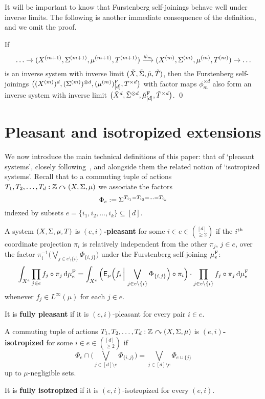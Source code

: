\documentclass[12pt]{article}
\begin{document}
It will be important to know that Furstenberg self-joinings behave
well under inverse limits.  The following is another immediate
consequence of the definition, and we omit the proof.

\begin{lem}\label{lem:Fberg-inv-lim}
If
\[\ldots\to(X^{(m+1)},\S^{(m+1)},\mu^{(m+1)},T^{(m+1)})\stackrel{\psi_m}{\longrightarrow}(X^{(m)},\S^{(m)},\mu^{(m)},T^{(m)})\to\ldots\]
is an inverse system with inverse limit
$(\tilde{X},\tilde{\S},\tilde{\mu},\tilde{T})$, then the Furstenberg
self-joinings $\big((X^{(m)})^d,(\S^{(m)})^{\otimes
d},(\mu^{(m)})^{\rm{F}}_{[d]},T^{\times d}\big)$ with factor maps
$\phi_m^{\times d}$ also form an inverse system with inverse limit
$\big(\tilde{X}^d,\tilde{\S}^{\otimes
d},\tilde{\mu}^{\rm{F}}_{[d]},\tilde{T}^{\times d}\big)$. \qed
\end{lem}

\section{Pleasant and isotropized extensions}

We now introduce the main technical definitions of this paper: that
of `pleasant systems', closely following~\cite{Aus--nonconv}, and
alongside them the related notion of `isotropized systems'. Recall
that to a commuting tuple of actions
$T_1,T_2,\ldots,T_d:\bbZ\curvearrowright (X,\S,\mu)$ we associate
the factors
\[\Phi_e := \S^{T_{i_1} = T_{i_2} = \ldots = T_{i_k}}\]
indexed by subsets $e = \{i_1,i_2,\ldots,i_k\}\subseteq [d]$.

\begin{dfn}\label{dfn:pleasant}
A system $(X,\S,\mu,T)$ is \textbf{$(e,i)$-pleasant} for some $i \in
e\in\binom{[d]}{\geq 2}$ if the $i^{\rm{th}}$ coordinate projection
$\pi_i$ is relatively independent from the other $\pi_j$, $j \in e$,
over the factor $\pi_i^{-1}\big(\bigvee_{j\in e
\setminus\{i\}}\Phi_{\{i,j\}}\big)$ under the Furstenberg
self-joining $\mu^{\rm{F}}_e$:
\[\int_{X^e}\prod_{j\in e}f_j\circ\pi_j\,\d\mu^{\rm{F}}_e =
\int_{X^e}\Big(\sfE_\mu\Big(f_i\,\Big|\,\bigvee_{j\in e
\setminus\{i\}}\Phi_{\{i,j\}}\Big)\circ\pi_i\Big)\cdot\prod_{j\in
e\setminus \{i\}}f_j\circ\pi_j\,\d\mu^{\rm{F}}_e\] whenever $f_j \in
L^\infty(\mu)$ for each $j\in e$.

It is \textbf{fully pleasant} if it is $(e,i)$-pleasant for every
pair $i\in e$.
\end{dfn}

\begin{dfn}\label{dfn:isotropized}
A commuting tuple of actions
$T_1,T_2,\ldots,T_d:\bbZ\curvearrowright (X,\S,\mu)$ is
\textbf{$(e,i)$-isotropized} for some $i \in e \in\binom{[d]}{\geq
2}$ if
\[\Phi_e\cap \Big(\bigvee_{j\in[d]\setminus e}\Phi_{\{i,j\}}\Big) = \bigvee_{j\in[d]\setminus e}\Phi_{e\cup\{j\}}\]
up to $\mu$-negligible sets.

It is \textbf{fully isotropized} if it is $(e,i)$-isotropized for
every $(e,i)$.
\end{dfn}
\end{document}

